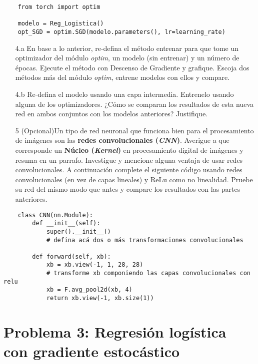 \begin{verbatim}
    from torch import optim

    modelo = Reg_Logistica()
    opt_SGD = optim.SGD(modelo.parameters(), lr=learning_rate)
\end{verbatim}

\begin{itemize}
    \item[4.a] En base a lo anterior, re-defina el método entrenar para que tome un optimizador del módulo \textit{optim}, un modelo (sin entrenar) y un número de épocas. Ejecute el método con Descenso de Gradiente y grafique. Escoja dos métodos más del módulo \textit{optim}, entrene modelos con ellos y compare.
    \item[4.b] Re-defina el modelo usando una capa intermedia. Entrenelo usando alguna de los optimizadores. ¿Cómo se comparan los resultados de esta nueva red en ambos conjuntos con los modelos anteriores? Justifique.
    \item[5] (Opcional)Un tipo de red neuronal que funciona bien para el procesamiento de imágenes son las \textbf{redes convolucionales (\textit{CNN})}. Averigue a que corresponde un \textbf{Núcleo (\textit{Kernel})} en procesamiento digital de imágenes y resuma en un parrafo. Investigue y mencione alguna ventaja de usar redes convolucionales. A continuación complete el siguiente código usando \href{https://pytorch.org/docs/stable/generated/torch.nn.Conv2d.html}{redes convolucionales} (en vez de capas lineales) y \href{https://pytorch.org/docs/stable/generated/torch.nn.functional.relu.html}{ReLu} como no linealidad. Pruebe su red del mismo modo que antes y compare los resultados con las partes anteriores.
\end{itemize}
\begin{verbatim}
    class CNN(nn.Module):
        def __init__(self):
            super().__init__()
            # defina acá dos o más transformaciones convolucionales
    
        def forward(self, xb):
            xb = xb.view(-1, 1, 28, 28)
            # transforme xb componiendo las capas convolucionales con relu
            xb = F.avg_pool2d(xb, 4)
            return xb.view(-1, xb.size(1))
\end{verbatim}


\iffalse
\section*{Problema 3: Regresión logística con gradiente estocástico }

